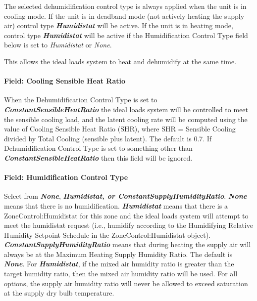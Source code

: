 The selected dehumidification control type is always applied when the unit is in cooling mode. If the unit is in deadband mode (not actively heating the supply air) control type \textbf{\emph{Humidistat}} will be active. If the unit is in heating mode, control type \textbf{\emph{Humidistat}} will be active if the Humidification Control Type field below is set to \emph{Humidistat} or \emph{None}.

This allows the ideal loads system to heat and dehumidify at the same time.

\paragraph{Field: Cooling Sensible Heat Ratio}\label{field-cooling-sensible-heat-ratio-000}

When the Dehumidification Control Type is set to \textbf{\emph{ConstantSensibleHeatRatio}} the ideal loads system will be controlled to meet the sensible cooling load, and the latent cooling rate will be computed using the value of Cooling Sensible Heat Ratio (SHR), where SHR = Sensible Cooling divided by Total Cooling (sensible plus latent). The default is 0.7. If Dehumidification Control Type is set to something other than \textbf{\emph{ConstantSensibleHeatRatio}} then this field will be ignored.

\paragraph{Field: Humidification Control Type}\label{field-humidification-control-type-000}

Select from \textbf{\emph{None}}, \textbf{\emph{Humidistat, or ConstantSupplyHumidityRatio}}. \textbf{\emph{None}} means that there is no humidification. \textbf{\emph{Humidistat}} means that there is a ZoneControl:Humidistat for this zone and the ideal loads system will attempt to meet the humidistat request (i.e., humidify according to the Humidifying Relative Humidity Setpoint Schedule in the ZoneControl:Humidistat object). \textbf{\emph{ConstantSupplyHumidityRatio}} means that during heating the supply air will always be at the Maximum Heating Supply Humidity Ratio. The default is \textbf{\emph{None}}. For \textbf{\emph{Humidistat}}, if the mixed air humidity ratio is greater than the target humidity ratio, then the mixed air humidity ratio will be used. For all options, the supply air humidity ratio will never be allowed to exceed saturation at the supply dry bulb temperature.

